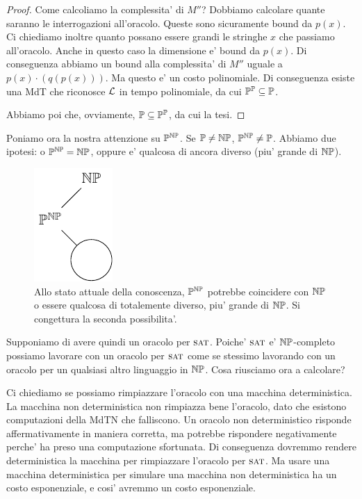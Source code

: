 \begin{proof}
    Come calcoliamo la complessita' di $M''$? Dobbiamo calcolare quante saranno le interrogazioni
    all'oracolo. Queste sono sicuramente bound da $p(x)$. Ci chiediamo inoltre quanto possano essere
    grandi le stringhe $x$ che passiamo all'oracolo. Anche in questo caso la dimensione e' bound da
    $p(x)$. Di conseguenza abbiamo un bound alla complessita' di $M''$ uguale a
    $p(x)\cdot(q(p(x)))$. Ma questo e' un costo polinomiale. Di conseguenza esiste una MdT che
    riconosce $\mathcal{L}$ in tempo polinomiale, da cui $\mathbb{P}^{\mathbb{P}} \subseteq \mathbb{P}$.

    Abbiamo poi che, ovviamente, $\mathbb{P} \subseteq \mathbb{P}^{\mathbb{P}}$, da cui la tesi.
\end{proof}

Poniamo ora la nostra attenzione su $\mathbb{P}^{\mathbb{NP}}$. Se $\mathbb{P} \not= \mathbb{NP}$,
$\mathbb{P}^{\mathbb{NP}} \not= \mathbb{P}$. Abbiamo due ipotesi: o $\mathbb{P}^{\mathbb{NP}} = \mathbb{NP}$, oppure
e' qualcosa di ancora diverso (piu' grande di $\mathbb{NP}$).

\begin{figure}[h]
    \begin{center}
        \includegraphics{./img/oracles/PNP.pdf}
        \caption{Allo stato attuale della conoscenza, $\mathbb{P}^{\mathbb{NP}}$ potrebbe coincidere con
        $\mathbb{NP}$ o essere qualcosa di totalemente diverso, piu' grande di $\mathbb{NP}$. Si
    congettura la seconda possibilita'.}
    \end{center}
\end{figure}

Supponiamo di avere quindi un oracolo per $\textsc{sat}$. Poiche' $\textsc{sat}$ e' $\mathbb{NP}$-completo possiamo
lavorare con un oracolo per $\textsc{sat}$ come se stessimo lavorando con un oracolo per un qualsiasi altro
linguaggio in $\mathbb{NP}$. Cosa riusciamo ora a calcolare? 

Ci chiediamo se possiamo rimpiazzare l'oracolo con una macchina deterministica. La macchina non
deterministica non rimpiazza bene l'oracolo, dato che esistono computazioni della MdTN che
falliscono. Un oracolo non deterministico risponde affermativamente in maniera corretta, ma potrebbe
rispondere negativamente perche' ha preso una computazione sfortunata. Di conseguenza dovremmo
rendere deterministica la macchina per rimpiazzare l'oracolo per $\textsc{sat}$. Ma usare una macchina
deterministica per simulare una macchina non deterministica ha un costo esponenziale, e cosi'
avremmo un costo esponenziale.


